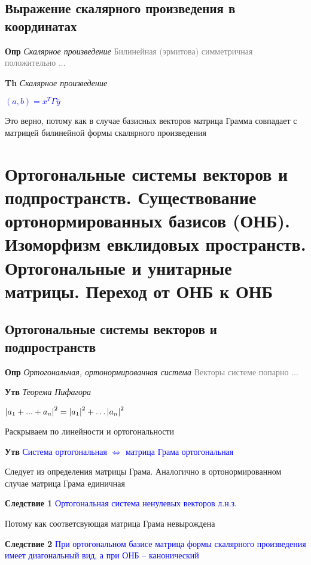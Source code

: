 \documentclass[a4paper, 14pt]{article}
\begin{document}
    \subsection{Выражение скалярного произведения в координатах}

    \textbf{Опр} \textit{Скалярное произведение} \textcolor{gray}{Билинейная (эрмитова) симметричная положительно ...}

    \textbf{Th} \textit{Скалярное произведение}

    \textcolor{blue}{$(a, b) = x^T \Gamma \overline{y}$}

    Это верно, потому как в случае базисных векторов матрица Грамма совпадает с матрицей билинейной формы скалярного
    произведения

    \section{Ортогональные системы векторов и подпространств.
    Существование ортонормированных базисов (ОНБ).
    Изоморфизм евклидовых пространств.
    Ортогональные и унитарные матрицы.
    Переход от ОНБ к ОНБ}

    \subsection{Ортогональные системы векторов и подпространств}

    \textbf{Опр} \textit{Ортогональная, ортонормированная система} \textcolor{gray}{Векторы системе попарно ...}

    \textbf{Утв} \textit{Теорема Пифагора}

    \textcolor{blue}{$\abs{a_1 + ... + a_n}^2 = \abs{a_1}^2 + \dots \abs{a_n}^2$}

    Раскрываем по линейности и ортогональности

    \textbf{Утв} \textcolor{blue}{Система ортогональная $\Leftrightarrow$ матрица Грама ортогональная}

    Следует из определения матрицы Грама.
    Аналогично в ортонормированном случае матрица Грама единичная

    \textbf{Следствие 1} \textcolor{blue}{Ортогональная система ненулевых векторов л.н.з.}

    Потому как соответсвующая матрица Грама невырождена

    \textbf{Следствие 2} \textcolor{blue}{При ортогональном базисе матрица формы скалярного произведения имеет
    диагональный вид, а при ОНБ -- канонический}
\end{document}
